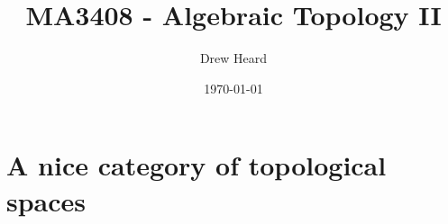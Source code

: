 \documentclass[a4paper]{tufte-book}
\title{MA3408 - Algebraic Topology II}
\date{\today}
\author{Drew Heard}
\numberwithin{equation}{section}
\theoremstyle{remark}
\begin{document}
\maketitle


\appendix
\chapter{A nice category of topological spaces}
\end{document}
